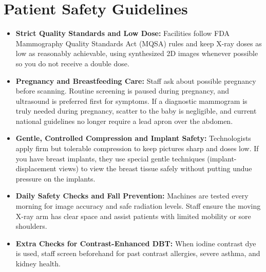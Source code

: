 \section{Patient Safety Guidelines}
\begin{itemize}
\item \textbf{Strict Quality Standards and Low Dose:} Facilities follow FDA Mammography Quality Standards Act (MQSA) rules and keep X-ray doses as low as reasonably achievable, using synthesized 2D images whenever possible so you do not receive a double dose.
\item \textbf{Pregnancy and Breastfeeding Care:} Staff ask about possible pregnancy before scanning. Routine screening is paused during pregnancy, and ultrasound is preferred first for symptoms. If a diagnostic mammogram is truly needed during pregnancy, scatter to the baby is negligible, and current national guidelines no longer require a lead apron over the abdomen.
\item \textbf{Gentle, Controlled Compression and Implant Safety:} Technologists apply firm but tolerable compression to keep pictures sharp and doses low. If you have breast implants, they use special gentle techniques (implant-displacement views) to view the breast tissue safely without putting undue pressure on the implants.
\item \textbf{Daily Safety Checks and Fall Prevention:} Machines are tested every morning for image accuracy and safe radiation levels. Staff ensure the moving X-ray arm has clear space and assist patients with limited mobility or sore shoulders.
\item \textbf{Extra Checks for Contrast-Enhanced DBT:} When iodine contrast dye is used, staff screen beforehand for past contrast allergies, severe asthma, and kidney health.
\end{itemize}

